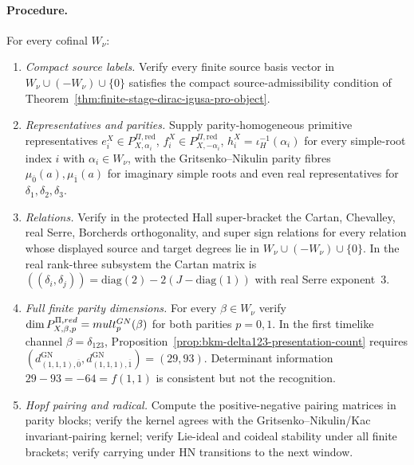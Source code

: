 \paragraph{Procedure.}
For every cofinal \(W_\nu\):
\begin{enumerate}
\item[\textup{(R0)}] \emph{Compact source labels.}  Verify every
finite source basis vector in \(W_\nu\cup(-W_\nu)\cup\{0\}\) satisfies
the compact source-admissibility condition of
Theorem~\ref{thm:finite-stage-dirac-igusa-pro-object}.

\item[\textup{(R1)}] \emph{Representatives and parities.}  Supply
parity-homogeneous primitive representatives
\(e_i^X\in P^{\Pi,\mathrm{red}}_{X,\alpha_i}\),
\(f_i^X\in P^{\Pi,\mathrm{red}}_{X,-\alpha_i}\),
\(h_i^X=\iota_H^{-1}(\alpha_i)\) for every simple-root index \(i\) with
\(\alpha_i\in W_\nu\), with the Gritsenko--Nikulin parity fibres
\(\mu_{\overline 0}(a),\mu_{\overline 1}(a)\) for imaginary simple
roots and even real representatives for \(\delta_1,\delta_2,\delta_3\).

\item[\textup{(R2)}] \emph{Relations.}  Verify in the protected Hall
super-bracket the Cartan, Chevalley, real Serre, Borcherds
orthogonality, and super sign relations for every relation whose
displayed source and target degrees lie in
\(W_\nu\cup(-W_\nu)\cup\{0\}\).  In the real rank-three subsystem the
Cartan matrix is
\(((\delta_i,\delta_j))=\mathrm{diag}(2)-2(J-\mathrm{diag}(1))\) with
real Serre exponent~3.

\item[\textup{(R3)}] \emph{Full finite parity dimensions.}  For every
\(\beta\in W_\nu\) verify
\(\dim P^{\Pi,red}_{X,\beta,p}
=mult_{p}^{GN}(\beta)\) for both parities
\(p=0,1\).  In the first timelike channel
\(\beta=\delta_{123}\),
Proposition~\ref{prop:bkm-delta123-presentation-count} requires
\((d^{\mathrm{GN}}_{(1,1,1),\overline 0},
d^{\mathrm{GN}}_{(1,1,1),\overline 1})=(29,93)\).  Determinant
information \(29-93=-64=f(1,1)\) is consistent but not the
recognition.

\item[\textup{(R4)}] \emph{Hopf pairing and radical.}  Compute the
positive-negative pairing matrices in parity blocks; verify the
kernel agrees with the
Gritsenko--Nikulin/Kac invariant-pairing kernel; verify Lie-ideal and
coideal stability under all finite brackets; verify carrying under
HN transitions to the next window.


\end{enumerate}
